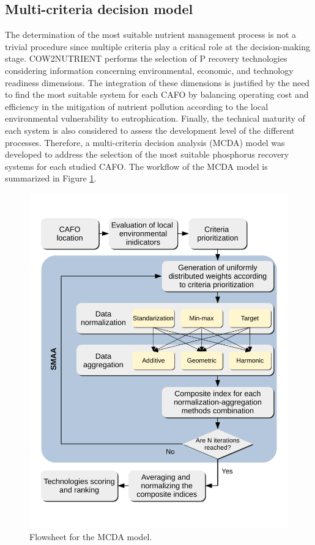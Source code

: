 \documentclass[authoryear]{elsarticle}
\begin{document}
\subsection{Multi-criteria decision model}
The determination of the most suitable nutrient management process is not a trivial procedure since multiple criteria play a critical role at the decision-making stage. COW2NUTRIENT performs the selection of P recovery technologies considering information concerning environmental, economic, and technology readiness dimensions. The integration of these dimensions is justified by the need to find the most suitable system for each CAFO by balancing operating cost and efficiency in the mitigation of nutrient pollution according to the local environmental vulnerability to eutrophication. Finally, the technical maturity of each system is also considered to assess the development level of the different processes. Therefore, a multi-criteria decision analysis (MCDA) model was developed to address the selection of the most suitable phosphorus recovery systems for each studied CAFO. The workflow of the MCDA model is summarized in Figure \ref{fig:MCDA_SMAA}.

\begin{figure}[h]
	\centering
	\includegraphics[width=0.6\linewidth, trim={0cm 1cm 0cm 1cm},clip]{MCDA_SMAA.pdf} 
	\caption{Flowsheet for the MCDA model.}
	\label{fig:MCDA_SMAA}
\end{figure}
\end{document}
